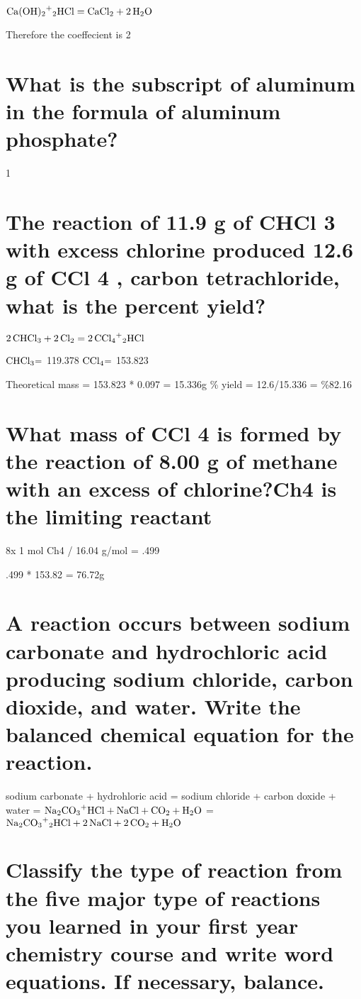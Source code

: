 \documentclass{scrartcl}
\begin{document}
\(\ce{Ca(OH)2+2HCl}=\ce{CaCl2 + 2H2O}\)

Therefore the coeffecient is 2

\section{What is the subscript of aluminum in the formula of aluminum phosphate?}
\label{sec:org43adacf}
1

\section{The reaction of 11.9 g of CHCl 3 with excess chlorine produced 12.6 g of CCl 4 , carbon tetrachloride, what is the percent yield?}
\label{sec:org2934051}

\(\ce{2CHCl3 + 2Cl2}=\ce{2CCl4+2HCl}\)

\(\ce{CHCl3=}\) 119.378
\(\ce{CCl4=}\) 153.823

Theoretical mass = 153.823 * 0.097 = 15.336g
\% yield = 12.6/15.336 = \%82.16

\section{What mass of CCl 4 is formed by the reaction of 8.00 g of methane with an excess of chlorine?Ch4 is the limiting reactant}
\label{sec:org335c59d}

8x 1 mol Ch4 / 16.04 g/mol = .499

.499 * 153.82 = 76.72g

\section{A reaction occurs between sodium carbonate and hydrochloric acid producing sodium chloride, carbon dioxide, and water. Write the balanced chemical equation for the reaction.}
\label{sec:org00164c7}

sodium carbonate + hydrohloric acid = sodium chloride + carbon doxide + water
= \(\ce{Na2CO3+HCl}+\ce{NaCl + CO2 + H2O}\)
= \(\ce{Na2CO3+2HCl}+\ce{2NaCl + 2CO2 + H2O}\)

\section{Classify the type of reaction from the five major type of reactions you learned in your first year chemistry course and write word equations. If necessary, balance.}
\label{sec:orga67d425}
\end{document}
